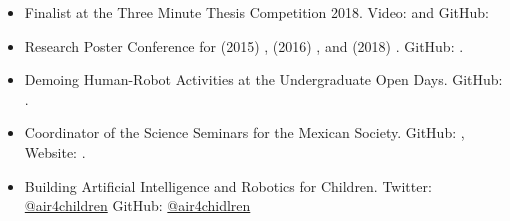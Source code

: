\documentclass{mycv}
\begin{document}
\begin{itemize}
\item  Finalist at the Three Minute Thesis Competition 2018. 
	Video: \href{https://www.youtube.com/watch?v=07ewRYcS-0g}{\faYoutube} and 
	GitHub: \href{https://github.com/mxochicale/3mt}{\faGithub*} 
\item Research Poster Conference for 
	(2015) \href{https://github.com/mxochicale/PhD/blob/master/posters/Research_Poster_Conference_UoB/2015/poster/poster.pdf}{\faImage}, 
	(2016) \href{https://github.com/mxochicale/PhD/blob/master/posters/Research_Poster_Conference_UoB/2016/poster/poster.pdf}{\faImage}, and  
	(2018) \href{https://github.com/mxochicale/PhD/blob/master/posters/Research_Poster_Conference_UoB/2018/poster/main/map479-poster-uob2018.pdf}{\faImage}.
	GitHub: \href{https://github.com/mxochicale/PhD/tree/master/posters/Research_Poster_Conference_UoB}{\faGithub*}.
\item Demoing Human-Robot Activities at the Undergraduate Open Days. 
	GitHub: \href{https://github.com/mxochicale/opendayuob-hridemo}{\faGithub*}. 
\item Coordinator of the Science Seminars for the Mexican Society.  
	GitHub: \href{https://github.com/MexicanSocietyUoB}{\faGithub*}, 
	Website: \href{https://mexicansocietyuob.github.io/seminars/}{\faExternalLink*}. 




\item Building Artificial Intelligence and Robotics for Children. 
	Twitter: \href{https://twitter.com/air4children}{\faTwitter @air4children} 
	GitHub: \href{https://github.com/air4children}{\faGithub* @air4chidlren} 



\end{itemize}
\end{document}

